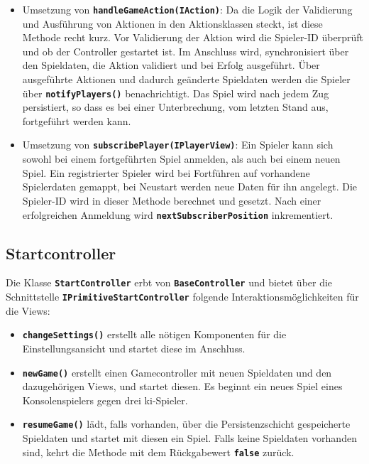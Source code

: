 \documentclass[
							a4paper, 
							11pt, 
							openany, 
							liststotoc,
							parskip=half, 
   							headings=normal
						]{scrreprt}
\begin{document}
{\begin{itemize}
	\item Umsetzung von \textbf{\texttt{handleGameAction(IAction)}}:\newline
Da die Logik der Validierung und Ausführung von Aktionen in den Aktionsklassen steckt,  ist diese Methode recht kurz. Vor Validierung der Aktion wird die Spieler-ID überprüft und ob der Controller gestartet ist. Im Anschluss wird, synchronisiert über den Spieldaten, die Aktion validiert und bei Erfolg ausgeführt. Über ausgeführte Aktionen und dadurch geänderte Spieldaten werden die Spieler über \textbf{\texttt{notifyPlayers()}} benachrichtigt. Das Spiel wird nach jedem Zug persistiert, so dass es bei einer Unterbrechung, vom letzten Stand aus, fortgeführt werden kann.
	\item Umsetzung von \textbf{\texttt{subscribePlayer(IPlayerView)}}:\newline
Ein Spieler kann sich sowohl bei einem fortgeführten Spiel anmelden, als auch bei einem neuen Spiel. Ein registrierter Spieler wird bei Fortführen auf vorhandene Spielerdaten gemappt, bei Neustart werden neue Daten für ihn angelegt.
Die Spieler-ID wird in dieser Methode berechnet und gesetzt. Nach einer erfolgreichen Anmeldung wird \textbf{\texttt{nextSubscriberPosition}} inkrementiert.
\end{itemize}


\subsection{Startcontroller} \label{sse:anwendung_controller_start}
Die Klasse \textbf{\texttt{StartController}} erbt von \textbf{\texttt{BaseController}} und bietet über die Schnittstelle \textbf{\texttt{IPrimitiveStartController}} folgende Interaktionsmöglichkeiten für die Views:

\begin{itemize}
	\item \textbf{\texttt{changeSettings()}} erstellt alle nötigen Komponenten für die Einstellungsansicht und startet diese im Anschluss.
	\item \textbf{\texttt{newGame()}} erstellt einen Gamecontroller mit neuen Spieldaten und den dazugehörigen Views, und startet diesen. Es beginnt ein neues Spiel eines Konsolenspielers gegen drei \acs{ki}-Spieler.
	\item \textbf{\texttt{resumeGame()}} lädt, falls vorhanden, über die Persistenzschicht gespeicherte Spieldaten und startet mit diesen ein Spiel. Falls keine Spieldaten vorhanden sind, kehrt die Methode mit dem Rückgabewert \textbf{\texttt{false}} zurück.
\end{itemize}

}
\end{document}
